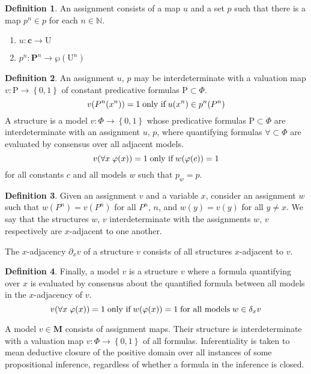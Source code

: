 \documentclass{amsbook}
\newcommand{\setsm}[1]{\left\{#1\right\}}
\newcommand{\univ}[1]{\mathord\forall#1\;}
\theoremstyle{definition}
\newtheorem{dfn}{Definition}[section]
\begin{document}
\begin{dfn}
    An assignment consists of a map $u$ and a set $p$ such that there is a map $p^n \in p$ for each $n \in \mathbb N$.
    \begin{enumerate}
        \item $u: \mathbf c \longrightarrow \mathrm U$
        \item $p^n: \mathbf P^n \longrightarrow \wp(\mathrm U^n)$
    \end{enumerate}
\end{dfn}

\begin{dfn}
    An assignment $u$, $p$ may be interdeterminate with a valuation map $v: \mathrm P \longrightarrow \setsm{0,1}$ of constant predicative formulas $\mathrm P \subset \Phi$.
    $$v(P^n(x^n)) = 1 \text{\;only if\;} u(x^n) \in p^n(P^n)$$
    A structure is a model $v: \Phi \longrightarrow \setsm{0,1}$ whose predicative formulas $\mathrm P \subset \Phi$ are interdeterminate with an assignment $u$, $p$, where quantifying formulas $\mathord\forall \subset \Phi$ are evaluated by consensus over all adjacent models.
    $$v(\univ x \varphi(x)) = 1 \text{\;only if\;} w(\varphi(c)) = 1$$
    for all constants $c$ and all models $w$ such that $p_w = p$.
\end{dfn}

\begin{dfn}
    Given an assignment $v$ and a variable $x$, consider an assignment $w$ such that $w(P^n) = v(P^n)$ for all $P^n$, $n$, and $w(y) = v(y)$ for all $y \neq x$. We say that the structures $w$, $v$ interdeterminate with the assignments $w$, $v$ respectively are $x$-adjacent to one another.

    The $x$-adjacency $\partial_x v$ of a structure $v$ consists of all structures $x$-adjacent to $v$.
\end{dfn}

\begin{dfn}

    Finally, a model $v$ is a structure $v$ where a formula quantifying over $x$ is evaluated by consensus about the quantified formula between all models in the $x$-adjacency of $v$.
    $$v(\univ x \varphi(x)) = 1 \text{\;only if\;} w(\varphi(x)) = 1 \text{\;for all models\;} w \in \delta_x v$$
\end{dfn}


\newpage



A model $v \in \mathbf M$ consists of assignment maps.
Their structure is interdeterminate with a valuation map $v: \Phi \longrightarrow \setsm{0,1}$ of all formulas.
Inferentiality is taken to mean deductive closure of the positive domain over all instances of some propositional inference, regardless of whether a formula in the inference is closed.
\end{document}
